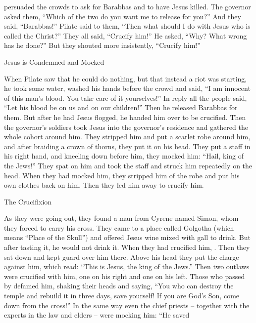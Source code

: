 {persuaded
the crowds
to
ask for
Barabbas
and
to have
Jesus
killed.
The governor
asked
them,
“Which
of
the two
do you want
me to release
for you?” And
they said,
“Barabbas!”
Pilate
said
to them,
“Then what
should I do
with Jesus
who is called
the Christ?” They
all
said,
“Crucify him!”
He asked,
“Why? What
wrong
has he done?” But
they shouted
more insistently,
“Crucify him!”
\par }{\SH Jesus is Condemned and Mocked
\par }{\PP {}When
Pilate
saw
that
he could do
nothing,
but
that instead
a riot
was starting,
he took
some water,
washed
his hands
before
the crowd
and said,
“I am
innocent
of
this man’s blood.
You take care
of it
yourselves!”
In reply
all
the people
said,
“Let his
blood
be on
us
and
on
our
children!”
Then
he released
Barabbas
for them.
But
after he had Jesus
flogged,
he handed
him over
to
be crucified.
Then
the governor’s
soldiers
took
Jesus
into
the governor’s residence
and gathered
the whole
cohort
around
him.
They stripped
him
and put
a scarlet
robe
around him,
and
after braiding
a crown
of
thorns,
they put
it on
his
head.
They put a staff
in
his
right hand,
and
kneeling down
before
him,
they mocked
him: “Hail,
king
of the Jews!”
They spat
on
him
and took
the staff
and
struck
him
repeatedly
on
the head.
When
they had mocked
him,
they stripped
him
of the robe
and
put
his
own clothes
back on him.
Then
they led
him
away
to
crucify him.
\par }{\SH The Crucifixion
\par }{\PP {}As
they were going out,
they found
a man
from Cyrene
named
Simon,
whom
they forced
to
carry
his
cross.
They came
to
a place
called
Golgotha
(which
means
“Place
of the Skull”)
and offered
Jesus
wine
mixed
with
gall
to drink.
But
after tasting
it, he would
not
drink it.
When
they had crucified
him,
{}.
Then
they sat down
and kept guard
over him
there.
Above
his
head
they put
the charge
against him,
which read: “This
is
Jesus,
the king
of the Jews.”
Then
two
outlaws
were crucified
with
him,
one
on
his right
and
one
on
his left.
Those who passed by
defamed
him,
shaking
their
heads
and
saying,
“You who can destroy
the temple
and
rebuild
it in
three
days,
save
yourself! If
you are
God’s
Son,
come down
from
the cross!”
In the same way
even
the chief priests
– together with
the experts in the law
and
elders –
were mocking him:
“He saved
}
